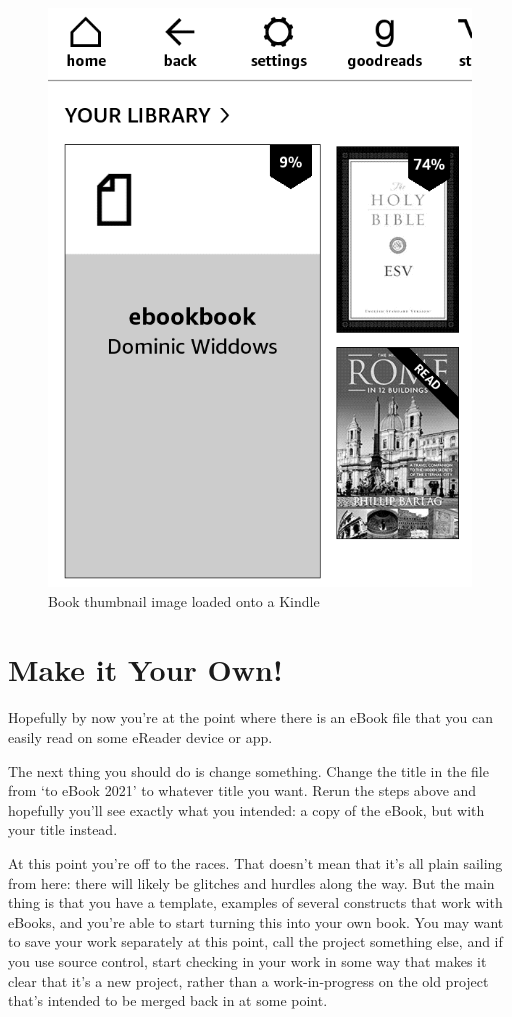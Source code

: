 \begin{figure}
  \begin{center}
  \includegraphics[width=0.6\linewidth]{images/kindle_screenshot.png}
  \htbr
  \caption{Book thumbnail image loaded onto a Kindle}
  \label{fig:kindle_screenshot}
 \end{center}
\end{figure}

\section{Make it Your Own!}

Hopefully by now you're at the point where there is an eBook file that you can easily read on some eReader device or app. 

The next thing you should do is change something. Change the title in the  file from `\latex to eBook 2021'
to whatever title you want. Rerun the steps above and hopefully you'll see exactly what you intended: a copy of the eBook, but with
your title instead.

At this point you're off to the races. That doesn't mean that it's all plain sailing from here: there will likely be glitches and hurdles along the way.
But the main thing is that you have a template, examples of several \latex constructs that work with eBooks, and you're able to start turning this
into your own book. You may want to save your work separately at this point, call the project something else, and if you use source control,
start checking in your work in some way that makes it clear that it's a new project, rather than a work-in-progress on the old project that's intended to be
merged back in at some point.

